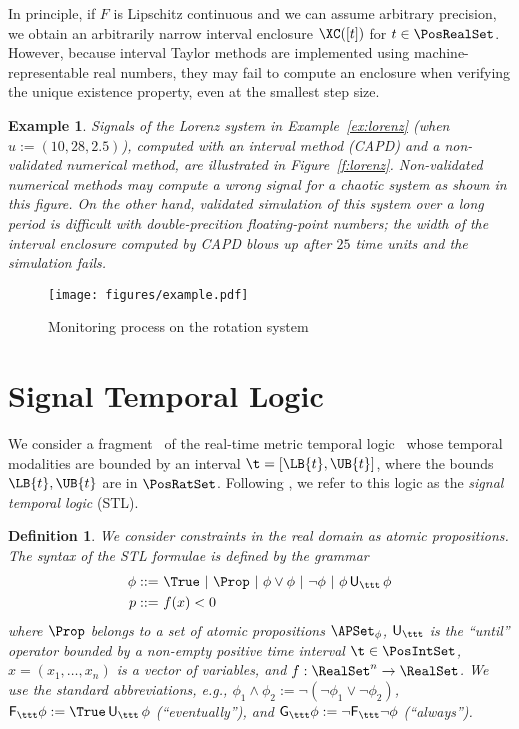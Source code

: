 \documentclass[paper]{ieice}
\newcommand{\Until}{\mathsf{U}}
\newcommand{\Always}{\mathsf{G}}
\newcommand{\Eventually}{\mathsf{F}}
\newtheorem{definition}{Definition}
\newtheorem{example}{Example}
\begin{document}
In principle, if $F$ is Lipschitz continuous and we can assume arbitrary precision, we obtain an arbitrarily narrow interval enclosure $\XC([t])$ for $t \in \PosRealSet$.
However, because interval Taylor methods are implemented using machine-representable real numbers, they may fail to compute an enclosure when verifying the unique existence property, even at the smallest step size.

\begin{example} \label{ex:lorenz:sig}
	Signals of the Lorenz system in Example~\ref{ex:lorenz} (when $u := (10,28,2.5)$), computed with an interval method (CAPD) and a non-validated numerical method, are illustrated in Figure~\ref{f:lorenz}.
	Non-validated numerical methods may compute a wrong signal for a chaotic system as shown in this figure. 
On the other hand, validated simulation of this system over a long period is difficult with double-precition floating-point numbers;
	the width of the interval enclosure computed by CAPD blows up after $25$ time units and the simulation fails.
\end{example}

\begin{figure*}[t]
\texttt{[image: figures/example.pdf]}
\caption{Monitoring process on the rotation system}
\label{f:rotation:proc}
\end{figure*}


\section{Signal Temporal Logic}
\label{s:stl}

We consider a fragment~\cite{Maler2003} of the real-time metric temporal logic~\cite{Alur1996} whose temporal modalities are bounded by an interval $\t = [\LB{t},\UB{t}]$, where the bounds $\LB{t},\UB{t}$ are in $\PosRatSet$.
Following \cite{Maler2003}, we refer to this logic as the \emph{signal temporal logic} (STL).

\begin{definition}
We consider constraints in the real domain as atomic propositions.
The syntax of the STL formulae is defined by the grammar
\begin{align*}
	\phi ::=&~ \True ~|~ \Prop ~|~ \phi \lor \phi ~|~ \neg \phi ~|~ \phi\,\Until_{\ttt}\,\phi \\
	p ::=&~ f(x) < 0 \end{align*}
where $\Prop$ belongs to a set of \emph{atomic propositions} $\APSet_\phi$, $\Until_{\ttt}$ is the ``until'' operator bounded by a non-empty positive time interval $\t \in {\PosIntSet}$, 
$x = (x_1,\ldots,x_n)$ is a vector of variables, and $f : \RealSet^{n} \to \RealSet$.
We use the standard abbreviations, e.g., $\phi_1\land\phi_2 := \neg(\neg\phi_1\lor\neg\phi_2)$, $\Eventually_\ttt \phi := \True\,\Until_\ttt\,\phi$ (``eventually''), and $\Always_\ttt\phi := \neg\Eventually_\ttt\neg\phi$ (``always'').
\end{definition}
\end{document}
